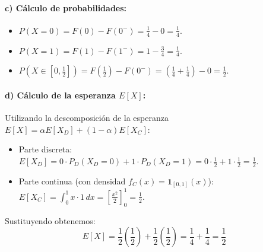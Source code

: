 \begin{problema}
\paragraph{c) Cálculo de probabilidades:}
\begin{itemize}
    \item $P(X = 0) = F(0) - F(0^-) = \frac{1}{4} - 0 = \frac{1}{4}$.
    \item $P(X = 1) = F(1) - F(1^-) = 1 - \frac{3}{4} = \frac{1}{4}$.
    \item $P\left(X \in \left[0, \frac{1}{2}\right]\right) = F\left(\frac{1}{2}\right) - F(0^-) = \left( \frac{1}{4} + \frac{1}{4} \right) - 0 = \frac{1}{2}$.
\end{itemize}

\paragraph{d) Cálculo de la esperanza $E[X]$:}
Utilizando la descomposición de la esperanza $E[X] = \alpha E[X_D] + (1-\alpha) E[X_C]$:
\begin{itemize}
    \item Parte discreta: $E[X_D] = 0 \cdot P_D(X_D = 0) + 1 \cdot P_D(X_D = 1) = 0 \cdot \frac{1}{2} + 1 \cdot \frac{1}{2} = \frac{1}{2}$.
    \item Parte continua (con densidad $f_C(x) = \mathbf{1}_{[0,1]}(x)$): $E[X_C] = \int_0^1 x \cdot 1 \, dx = \left[ \frac{x^2}{2} \right]_0^1 = \frac{1}{2}$.
\end{itemize}
Sustituyendo obtenemos:
\[
    E[X] = \frac{1}{2} \left( \frac{1}{2} \right) + \frac{1}{2} \left( \frac{1}{2} \right) = \frac{1}{4} + \frac{1}{4} = \frac{1}{2}
\]
\end{problema}

\newpage
